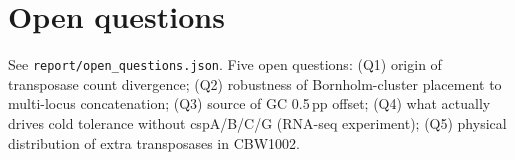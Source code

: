 \documentclass[11pt]{article}
\begin{document}
\section{Open questions}
See \texttt{report/open\_questions.json}. Five open questions: (Q1) origin of transposase count divergence; (Q2) robustness of Bornholm-cluster placement to multi-locus concatenation; (Q3) source of GC 0.5\,pp offset; (Q4) what actually drives cold tolerance without cspA/B/C/G (RNA-seq experiment); (Q5) physical distribution of extra transposases in CBW1002.
\end{document}
